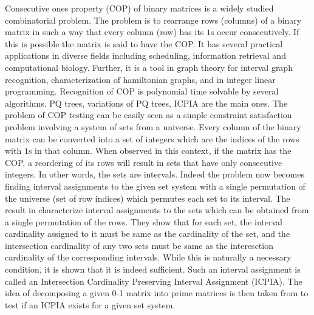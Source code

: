 \documentclass{llncs}
\begin{document}
\noindent
Consecutive ones property (COP) of binary matrices is a widely studied
combinatorial problem. The problem is to rearrange rows (columns) of a
binary matrix in such a way that every column (row) has its $1$s occur
consecutively. If this is possible the matrix is said to have the COP.  It
has several practical applications in diverse fields including
scheduling\cite{hl06}, information retrieval\cite{k77} and
computational biology\cite{abh98}.  Further, it is a tool in graph
theory\cite{mcg04} for interval graph recognition, characterization of
hamiltonian graphs, and in integer linear programming\cite{ht02,hl06}.
Recognition of COP is polynomial time solvable by several
algorithms. PQ trees\cite{bl76}, variations of PQ
trees\cite{mm09,wlh01,wlh02,mcc04}, ICPIA\cite{nsnrs09} are the main
ones.
\noindent
The problem of COP testing can be easily seen as a simple constraint
satisfaction problem involving a system of sets from a universe. Every
column of the binary matrix can be converted into a set of integers
which are the indices of the rows with $1$s in that column. When
observed in this context, if the matrix has the COP, a reordering of its
rows will result in sets that have only consecutive integers. In other
words, the sets are intervals. Indeed the problem now becomes finding
interval assignments to the given set system \cite{nsnrs09} with a
single permutation of the universe (set of row indices) which permutes each
set to its interval. The result in \cite{nsnrs09} characterize
interval assignments to the sets which can be obtained from a single
permutation of the rows.  They show that for each set, the interval
cardinality assigned to it must be same as the cardinality of the set,
and the intersection cardinality of any two sets must be same as the
interesction cardinality of the corresponding intervals.  While this
is naturally a necessary condition, it is shown that it is indeed
sufficient.  Such an interval assignment is called an Intersection
Cardinality Preserving Interval Assignment (ICPIA).  The idea of
decomposing a given 0-1 matrix into prime matrices is then taken from
\cite{wlh02} to test if an ICPIA exists for a given set system.
\end{document}

